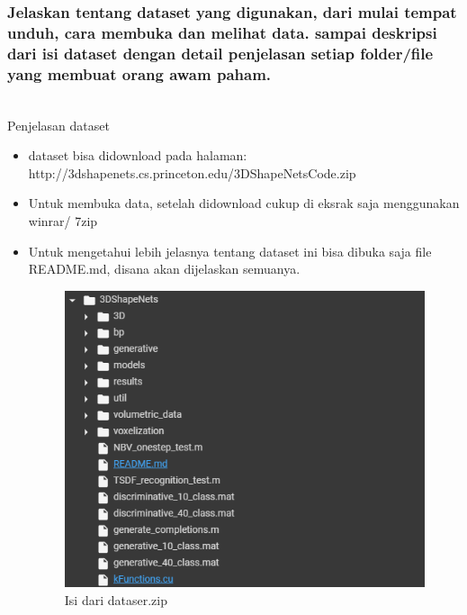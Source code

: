 \subsubsection{Jelaskan tentang dataset yang digunakan, dari mulai tempat unduh, cara membuka dan melihat data. sampai deskripsi dari isi dataset dengan detail penjelasan setiap folder/file yang membuat orang awam paham.}
\hfill\\
Penjelasan dataset
\begin{itemize}
	\item dataset bisa didownload pada halaman: http://3dshapenets.cs.princeton.edu/3DShapeNetsCode.zip
	\item Untuk membuka data, setelah didownload cukup di eksrak saja menggunakan winrar/ 7zip
	\item Untuk mengetahui lebih jelasnya tentang dataset ini bisa dibuka saja file README.md, disana akan dijelaskan semuanya.
\begin{figure}[H]
	\centering
	\includegraphics[scale=0.5]{figures/1174083/figures8/p6.png}
	\caption{Isi dari dataser.zip}
\end{figure}

\end{itemize}

